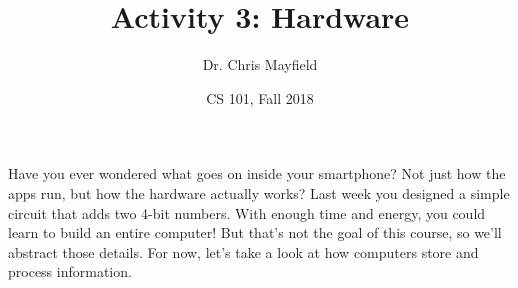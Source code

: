 \documentclass[12pt]{article}
\title{Activity 3: Hardware}
\author{Dr. Chris Mayfield}
\date{CS 101, Fall 2018}
\begin{document}
\maketitle

Have you ever wondered what goes on inside your smartphone?
Not just how the apps run, but how the hardware actually works?
Last week you designed a simple circuit that adds two 4-bit numbers.
With enough time and energy, you could learn to build an entire computer!
But that's not the goal of this course, so we'll abstract those details.
For now, let's take a look at how computers store and process information.



\end{document}
